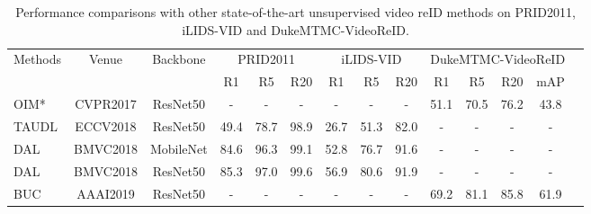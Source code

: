 \documentclass{cta-author}
\begin{document}
	\begin{table*}[!ht]
		\centering
		\begin{threeparttable}
			\caption{Performance comparisons with other state-of-the-art unsupervised video reID methods on PRID2011, iLIDS-VID and DukeMTMC-VideoReID.}\label{SOTA}
			\centering
			\begin{tabular}{lccccccccccccc}
				\hline
				\multirow{2}{*}{Methods}       & \multirow{2}{*}{Venue} & \multirow{2}{*}{Backbone}  & \multicolumn{3}{c}{PRID2011} & \multicolumn{3}{c}{iLIDS-VID}  & \multicolumn{4}{c}{DukeMTMC-VideoReID}\\
				\cmidrule(r){4-6}  \cmidrule(r){7-9} \cmidrule(r){10-13} 
				&            &            & R1       & R5  & R20  & R1   & R5   & R20  & R1 & R5 & R20 & mAP    \\ \hline
				OIM* \cite{RN248}                                                   & CVPR2017                   & ResNet50                   & -                      & -                      & -                      & -                               & -                      & -                      & 51.1                   & 70.5                   & 76.2                & 43.8                    \\
				TAUDL \cite{RN369}                                & ECCV2018  & ResNet50 & 49.4 & 78.7 & 98.9 & 26.7          & 51.3 & 82.0 & -    & -    & -    & -      \\
				DAL \cite{RN87}                                                     & BMVC2018                   & MobileNet                  & 84.6                   & 96.3                   & 99.1                   & 52.8                            & 76.7                   & 91.6                   & -                      & -                      & -                   & -                       \\
				DAL \cite{RN87}                                                     & BMVC2018                   & ResNet50                   & 85.3                   & 97.0                   & 99.6                   & 56.9                            & 80.6                   & 91.9                   & -                      & -                      & -                   & -                       \\
				BUC \cite{RN247}                                                    & AAAI2019                   & ResNet50                   & -                      & -                      & -                      & -                               & -                      & -                      & 69.2                   & 81.1                   & 85.8                & 61.9                    \\

\end{tabular}
\end{threeparttable}
\end{table*}
\end{document}
